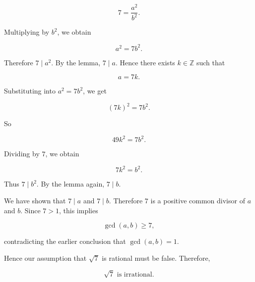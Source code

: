 \[
7=\frac{a^2}{b^2}.
\]

Multiplying by \(b^2\), we obtain

\[
a^2=7b^2.
\]

Therefore \(7\mid a^2\). By the lemma, \(7\mid a\). Hence there exists \(k\in \mathbb Z\) such that

\[
a=7k.
\]

Substituting into \(a^2=7b^2\), we get

\[
(7k)^2=7b^2.
\]

So

\[
49k^2=7b^2.
\]

Dividing by \(7\), we obtain

\[
7k^2=b^2.
\]

Thus \(7\mid b^2\). By the lemma again, \(7\mid b\).

We have shown that \(7\mid a\) and \(7\mid b\). Therefore \(7\) is a positive common divisor of \(a\) and \(b\). Since \(7>1\), this implies

\[
\gcd(a,b)\ge 7,
\]

contradicting the earlier conclusion that \(\gcd(a,b)=1\).

Hence our assumption that \(\sqrt{7}\) is rational must be false. Therefore,

\[
\boxed{\sqrt{7}\text{ is irrational}.}
\]